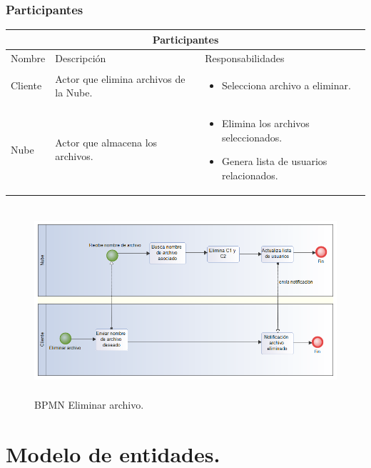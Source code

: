 \subsubsection{Participantes}

\begin{tabular}{ |p{2cm}|p{6cm}|p{6cm}| }
\hline
\multicolumn{3}{|c|}{ Participantes } \\
\hline

{ Nombre } & { Descripción } & { Responsabilidades} \\
\hline
{ Cliente } & Actor que elimina archivos de la Nube. & 
\begin{itemize} 
\item Selecciona archivo a eliminar.
\end{itemize} \\ 
\hline
{ Nube } & Actor que almacena los archivos. & 
\begin{itemize} 
\item Elimina los archivos seleccionados.
\item Genera lista de usuarios relacionados.
\end{itemize} \\ 
\hline
\end{tabular}

\begin{figure}[H]
\centering
\includegraphics[width=16cm, height=7cm]{./images/BPM_Eliminar.png}
\caption{BPMN Eliminar archivo.}

\end{figure} 

\newpage
\section{Modelo de entidades. }

